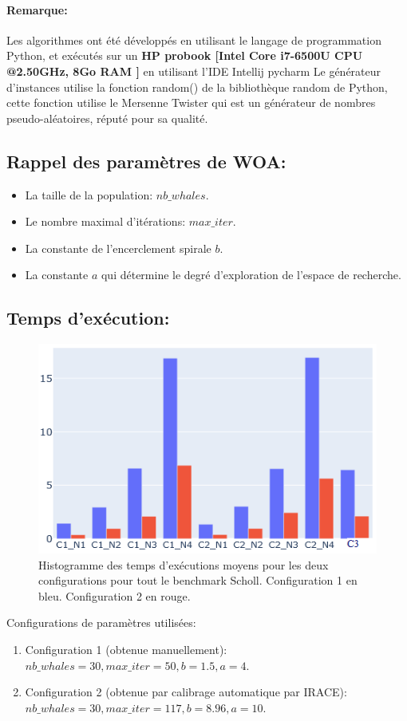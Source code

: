 \documentclass[12pt]{article}
\begin{document}
\paragraph{Remarque: } Les algorithmes ont été développés en utilisant le langage de programmation Python, et exécutés sur un \textbf{HP probook [Intel Core i7-6500U CPU @2.50GHz, 8Go RAM ]} en utilisant l'IDE Intellij pycharm
Le générateur d’instances utilise la fonction random() de la bibliothèque random de Python, cette fonction utilise le Mersenne Twister qui est un générateur de nombres pseudo-aléatoires, réputé pour sa qualité.

\subsection{Rappel des paramètres de WOA: }
\begin{itemize}
    \item La taille de la population: \(nb\_whales\).
    \item Le nombre maximal d’itérations: \(max\_iter\).
    \item La constante de l’encerclement spirale \(b\).
    \item La constante \(a\) qui détermine le degré d’exploration de l’espace de recherche.
\end{itemize}
\subsection{Temps d'exécution: }
\begin{figure}[!hbt]
    \includegraphics[width=\linewidth]{../figures/WOA/woa_texec.png}
    \caption{Histogramme des temps d'exécutions moyens pour les deux configurations pour tout le benchmark Scholl. Configuration 1 en bleu. Configuration 2 en rouge.}
\end{figure}
Configurations de paramètres utilisées:
\begin{enumerate}
    \item Configuration 1 (obtenue manuellement): \(nb\_whales=30, max\_iter=50, b=1.5, a=4\).
    \item Configuration 2 (obtenue par calibrage automatique par IRACE): \( nb\_whales=30, max\_iter=117, b=8.96, a=10\).
\end{enumerate}
\end{document}
